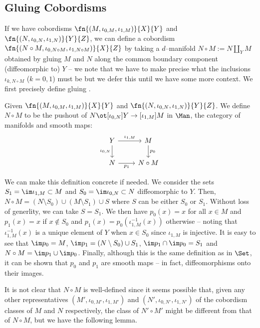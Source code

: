 
\subsection{Gluing Cobordisms}

If we have cobordisms $\fn{(M, \iota_{0, M}, \iota_{1, M})}{X}{Y}$ and
$\fn{(N, \iota_{0, N}, \iota_{1, N})}{Y}{Z}$, we can define a cobordism
$\fn{(N \circ M, \iota_{0, N \circ M}, \iota_{1, N \circ M})}{X}{Z}$ by taking a
$d$--manifold $N \circ M := N \amalg_{Y} M$ obtained by gluing $M$ and $N$ along
the common boundary component (diffeomorphic to) $Y$ -- we note that we have to
make precise what the inclusions $\iota_{k, N \circ M}$ ($k = 0, 1$) must be but
we defer this until we have some more context. We first precisely define gluing
\cite{Jorge}.
\begin{defn}
Given $\fn{(M, \iota_{0, M}, \iota_{1, M})}{X}{Y}$ and
$\fn{(N, \iota_{0, N}, \iota_{1, N})}{Y}{Z}$. We define $N \circ M$ to be the
pushout of $N \ot[\iota_{0, N}] Y \to[\iota_{1, M}] M$ in $\Man$, the category
of manifolds and smooth maps:
\[\begin{tikzcd}
  Y \arrow[r, "\iota_{1, M}"] \arrow[d, "\iota_{0, N}" left]
  & M \arrow[d, "p_0"]\\
  N \arrow[r, "p_1" below]
  & N \circ M
\end{tikzcd}\]
\end{defn}

\begin{rmk}
We can make this definition concrete if needed. We consider the sets
$S_1 = \im \iota_{1, M} \subset M$ and $S_0 = \im \iota_{0, N} \subset N$
diffeomorphic to $Y$. Then,
$N \circ M = (N \setminus S_0) \cup (M \setminus S_1) \cup S$ where $S$ can be
either $S_0$ or $S_1$. Without loss of generlity, we can take $S = S_1$. We then
have $p_0(x) = x$ for all $x \in M$ and $p_1(x) = x$ if $x \not\in S_0$ and
$p_1(x) = p_0(\iota_{1, M}^{-1}(x))$ otherwise -- noting that
$\iota_{1, M}^{-1}(x)$ is a unique element of $Y$ when $x \in S_0$ since
$\iota_{1, M}$ is injective. It is easy to see that $\im p_0 = M$,
$\im p_1 = (N \setminus S_0) \cup S_1$, $\im p_1 \cap \im p_0 = S_1$ and
$N \circ M = \im p_1 \cup \im p_0$. Finally, although this is the same
definition as in $\Set$, it can be shown that $p_0$ and $p_1$ are smooth maps --
in fact, diffeomorphisms onto their images.
\end{rmk}

It is not clear that $N \circ M$ is well-defined since it seems possible that,
given any other representatives $(M', \iota_{0, M'}, \iota_{1, M'})$ and $(N',
\iota_{0, N'}, \iota_{1, N'})$ of the cobordism classes of $M$ and $N$
respectively, the class of $N' \circ M'$ might be different from that of $N
\circ M$, but we have the following lemma.

